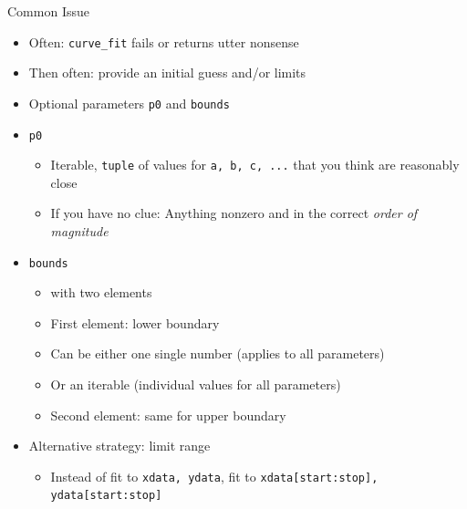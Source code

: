 
\begin{frame}{Common Issue}
%
\begin{itemize}
\item Often: \texttt{curve\_fit} fails or returns utter nonsense
\item Then often: provide an initial guess and/or limits
\item Optional parameters \texttt{p0} and \texttt{bounds}
\item \texttt{p0}
	\begin{itemize}
	\item Iterable, \eg \texttt{tuple} of values for \texttt{a, b, c, ...} that you think are reasonably close
	\item If you have no clue: Anything nonzero and in the correct \emph{order of magnitude}
	\end{itemize}
\item \texttt{bounds}
	\begin{itemize}
	\item {} with two elements
	\item First element: lower boundary
	\item Can be either one single number (applies to all parameters)
	\item Or an iterable (individual values for all parameters)
	\item Second element: same for upper boundary
	\end{itemize}
\item Alternative strategy: limit range
	\begin{itemize}
	\item Instead of fit to \texttt{xdata, ydata}, fit to \texttt{xdata[start:stop], ydata[start:stop]}
	\end{itemize}
\end{itemize}
%
\end{frame}


